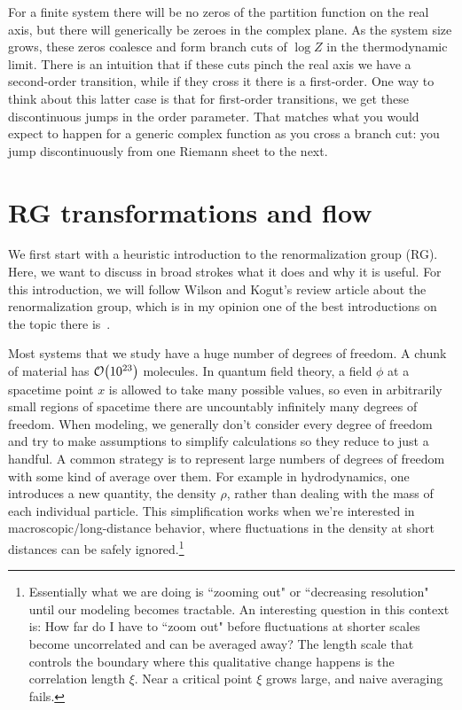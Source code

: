 For a finite system there will be no zeros of the partition function
on the real axis, but there will generically be zeroes in the complex
plane. As the system size grows, these zeros coalesce and form
branch cuts of $\log Z$ in the thermodynamic limit.
There is an intuition that if these cuts pinch the real axis we have a
second-order transition, while if they cross it there is a first-order.
One way to think about this latter case is that for first-order transitions, we
get these discontinuous jumps in the order parameter. That matches what you
would expect to happen for a generic complex function as you cross a branch cut:
you jump discontinuously from one Riemann sheet to the next.

\section{RG transformations and flow}\label{sec:RGflow}

We first start with a heuristic introduction to the 
renormalization group (RG).
Here, we want to discuss in broad strokes what it does and
why it is useful. For this introduction, we
will follow Wilson and Kogut's review article about the renormalization group,
which is in my opinion one of the best introductions on the topic there
is~\cite{wilson_renormalization_1974}.

Most systems that we study have a huge number of degrees of freedom. A chunk of
material has $\order{10^{23}}$ molecules. In quantum field theory, a field
$\phi$ at a spacetime point $x$ is allowed to take many possible values, so even
in arbitrarily small regions of spacetime there are uncountably infinitely many
degrees of freedom. When modeling, we generally don't consider every degree of
freedom and try to make assumptions to simplify calculations so they reduce to
just a handful. A common strategy is to represent large numbers of degrees of
freedom with some kind of average over them. For example in hydrodynamics, one
introduces a new quantity, the density $\rho$, rather than dealing with the
mass of each individual particle. This simplification works when we're
interested in macroscopic/long-distance behavior, where fluctuations in the
density at short distances can be safely ignored.\footnote{Essentially what we are doing
is ``zooming out" or ``decreasing resolution" until our modeling becomes
tractable. An interesting question in this context is: How far do I have to
``zoom out" before fluctuations at shorter scales become uncorrelated and can be
averaged away? The length scale that controls the boundary where this
qualitative change happens is the correlation length
$\xi$. Near a critical point $\xi$ grows large, and naive averaging fails.}

